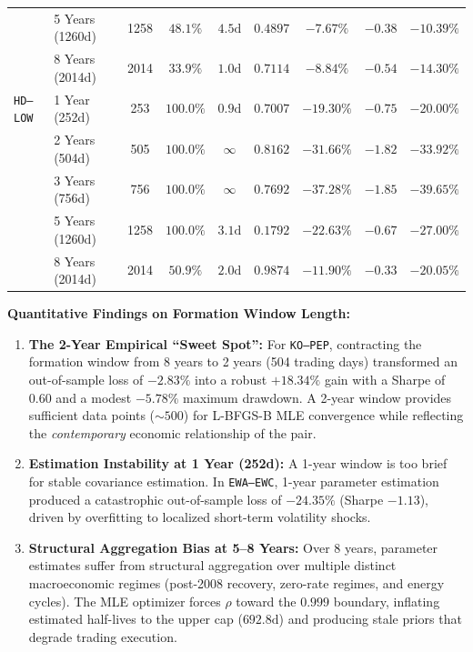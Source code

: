 \documentclass[11pt, a4paper]{article}
\begin{document}
\begin{table}[h!]
\begin{tabular}{llccccccc}
                 & 5 Years (1260d) & 1258 & $48.1\%$ & $4.5\text{d}$   & $0.4897$ & $-7.67\%$  & $-0.38$ & $-10.39\%$ \\
                 & 8 Years (2014d) & 2014 & $33.9\%$ & $1.0\text{d}$   & $0.7114$ & $-8.84\%$  & $-0.54$ & $-14.30\%$ \\
\midrule
\texttt{HD--LOW} & 1 Year (252d)  & 253  & $100.0\%$& $0.9\text{d}$   & $0.7007$ & $-19.30\%$ & $-0.75$ & $-20.00\%$ \\
                 & 2 Years (504d)  & 505  & $100.0\%$& $\infty$        & $0.8162$ & $-31.66\%$ & $-1.82$ & $-33.92\%$ \\
                 & 3 Years (756d)  & 756  & $100.0\%$& $\infty$        & $0.7692$ & $-37.28\%$ & $-1.85$ & $-39.65\%$ \\
                 & 5 Years (1260d) & 1258 & $100.0\%$& $3.1\text{d}$   & $0.1792$ & $-22.63\%$ & $-0.67$ & $-27.00\%$ \\
                 & 8 Years (2014d) & 2014 & $50.9\%$ & $2.0\text{d}$   & $0.9874$ & $-11.90\%$ & $-0.33$ & $-20.05\%$ \\
\bottomrule
\end{tabular}
\end{table}

\noindent\textbf{Quantitative Findings on Formation Window Length:}
\begin{enumerate}
    \item \textbf{The 2-Year Empirical ``Sweet Spot'':} For \texttt{KO--PEP}, contracting the formation window from 8 years to 2 years (504 trading days) transformed an out-of-sample loss of $-2.83\%$ into a robust $\mathbf{+18.34\%}$ gain with a Sharpe of $\mathbf{0.60}$ and a modest $-5.78\%$ maximum drawdown. A 2-year window provides sufficient data points ($\sim$$500$) for L-BFGS-B MLE convergence while reflecting the \textit{contemporary} economic relationship of the pair.
    \item \textbf{Estimation Instability at 1 Year (252d):} A 1-year window is too brief for stable covariance estimation. In \texttt{EWA--EWC}, 1-year parameter estimation produced a catastrophic out-of-sample loss of $-24.35\%$ (Sharpe $-1.13$), driven by overfitting to localized short-term volatility shocks.
    \item \textbf{Structural Aggregation Bias at 5--8 Years:} Over 8 years, parameter estimates suffer from structural aggregation over multiple distinct macroeconomic regimes (post-2008 recovery, zero-rate regimes, and energy cycles). The MLE optimizer forces $\rho$ toward the $0.999$ boundary, inflating estimated half-lives to the upper cap ($692.8\text{d}$) and producing stale priors that degrade trading execution.
\end{enumerate}
\end{document}
